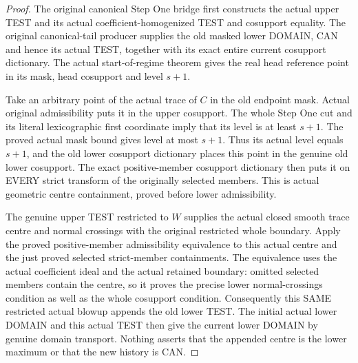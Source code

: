 \begin{proof}
The original canonical Step One bridge first constructs the actual upper
TEST and its actual coefficient-homogenized TEST and cosupport equality.
The original canonical-tail producer supplies the old masked lower DOMAIN,
CAN and hence its actual TEST, together with its exact entire current
cosupport dictionary. The actual start-of-regime theorem gives the real
head reference point in its mask, head cosupport and level $s+1$.

Take an arbitrary point of the actual trace of $C$ in the old endpoint
mask. Actual original admissibility puts it in the upper cosupport. The
whole Step One cut and its literal lexicographic first coordinate imply
that its level is at least $s+1$. The proved actual mask bound gives level
at most $s+1$. Thus its actual level equals $s+1$, and the old lower
cosupport dictionary places this point in the genuine old lower cosupport.
The exact positive-member cosupport dictionary then puts it on EVERY
strict transform of the originally selected members. This is actual
geometric centre containment, proved before lower admissibility.

The genuine upper TEST restricted to $W$ supplies the actual closed smooth
trace centre and normal crossings with the original restricted whole
boundary. Apply the proved positive-member admissibility equivalence to
this actual centre and the just proved selected strict-member containments.
The equivalence uses the actual coefficient ideal and the actual retained
boundary: omitted selected members contain the centre, so it proves the
precise lower normal-crossings condition as well as the whole cosupport
condition. Consequently this SAME restricted actual blowup appends the old
lower TEST. The initial actual lower DOMAIN and this actual TEST then give
the current lower DOMAIN by genuine domain transport. Nothing asserts that
the appended centre is the lower maximum or that the new history is CAN.
\end{proof}

